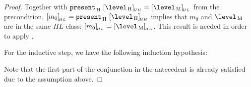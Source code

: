 \begin{proof}

Together with $\present\H~\eqcl{\level\H}{HH} = \eqcl{\level\M}{HL}$ from the precondition, $\eqcl{m_0}{HL} = \present\H~\eqcl{\level\H}{HH}$ implies that $m_0$ and $\level\M$ are in the same $HL$ class: $\eqcl{m_0}{HL}=\eqcl{\level\M}{HL}$. This result is needed in order to apply .


For the inductive step, we have the following induction hypothesis:


Note that the first part of the conjunction in the antecedent is already satisfied due to the assumption above.


\end{proof}

